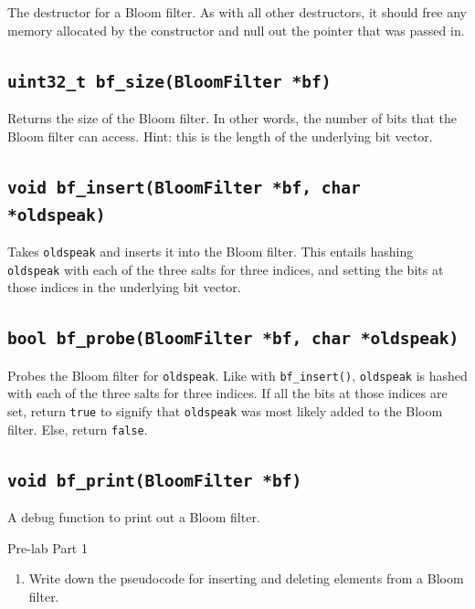\documentclass{article}
\begin{document}
The destructor for a Bloom filter. As with all other destructors, it
should free any memory allocated by the constructor and null out the
pointer that was passed in.

\subsection{\texttt{uint32\_t bf\_size(BloomFilter *bf)}}

Returns the size of the Bloom filter. In other words, the number of bits
that the Bloom filter can access. Hint: this is the length of the
underlying bit vector.

\subsection{\texttt{void bf\_insert(BloomFilter *bf, char *oldspeak)}}

Takes \texttt{oldspeak} and inserts it into the Bloom filter. This
entails hashing \texttt{oldspeak} with each of the three salts for three
indices, and setting the bits at those indices in the underlying bit
vector.

\subsection{\texttt{bool bf\_probe(BloomFilter *bf, char *oldspeak)}}

Probes the Bloom filter for \texttt{oldspeak}. Like with
\texttt{bf\_insert()}, \texttt{oldspeak} is hashed with each of the
three salts for three indices. If all the bits at those indices are set,
return \texttt{true} to signify that \texttt{oldspeak} was most likely
added to the Bloom filter. Else, return \texttt{false}.

\subsection{\texttt{void bf\_print(BloomFilter *bf)}}

A debug function to print out a Bloom filter.

\vspace{10pt}
\begin{prelab}{Pre-lab Part 1}
  \begin{enumerate}
    \item Write down the pseudocode for inserting and deleting elements from a
        Bloom filter.
  \end{enumerate}
\end{prelab}
\end{document}
